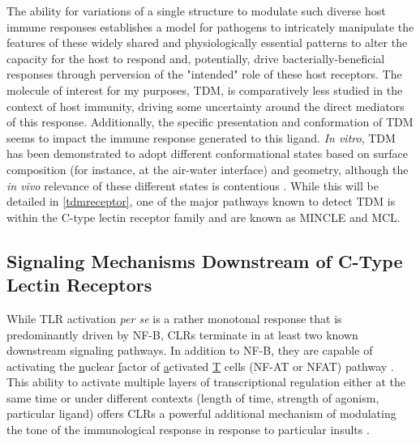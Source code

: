 The ability for variations of a single structure to modulate such diverse host immune responses establishes a model for pathogens to intricately manipulate the features of these widely shared and physiologically essential patterns to alter the capacity for the host to respond and, potentially, drive bacterially-beneficial responses through perversion of the "intended" role of these host receptors. The molecule of interest for my purposes, TDM, is comparatively less studied in the context of host immunity, driving some uncertainty around the direct mediators of this response. Additionally, the specific presentation and conformation of TDM seems to impact the immune response generated to this ligand. \textit{In vitro}, TDM has been demonstrated to adopt different conformational states based on surface composition (for instance, at the air-water interface) and geometry, although the \textit{in vivo} relevance of these different states is contentious \citep{Hunter2006, Behling1993}. While this will be detailed in \autoref{tdmreceptor}, one of the major pathways known to detect TDM is within the C-type lectin receptor family and are known as MINCLE and MCL.

\subsection{Signaling Mechanisms Downstream of C-Type Lectin Receptors}\label{clrsig}

While TLR activation \textit{per se} is a rather monotonal response that is predominantly driven by NF-\textkappa B, CLRs terminate in at least two known downstream signaling pathways. In addition to NF-\textkappa B, they are capable of activating the \underline{n}uclear \underline{f}actor of \underline{a}ctivated \underline{T} cells (NF-AT or NFAT) pathway \citep{Goodridge2007}. This ability to activate multiple layers of transcriptional regulation either at the same time or under different contexts (length of time, strength of agonism, particular ligand) offers CLRs a powerful additional mechanism of modulating the tone of the immunological response in response to particular insults \citep{Brown2018}. 

